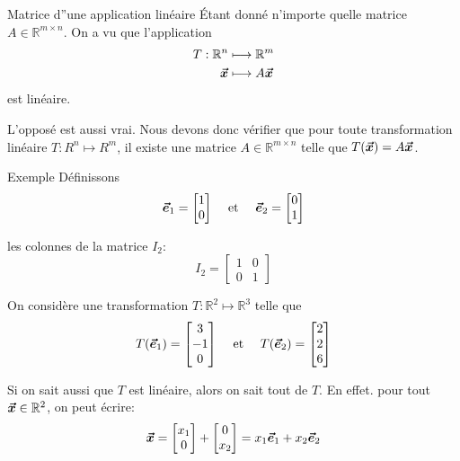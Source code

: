 \documentclass{article}
\begin{document}
\begin{parag}{Matrice d''une application linéaire}
    Étant donné n'importe quelle matrice $A \in \mathbb{R}^{m \times n}$. On a vu que l'application
    \[\begin{split}
    T: \mathbb{R}^{n} &\longmapsto \mathbb{R}^{m} \\
    \bm{\protect\vec{x}} &\longmapsto A \bm{\protect\vec{x}}
    \end{split}\]
    est linéaire.

    L'opposé est aussi vrai. Nous devons donc vérifier que pour toute transformation linéaire $T: R^{n} \mapsto R^{m}$, il existe une matrice $A \in \mathbb{R}^{m \times n}$ telle que $T\left(\bvec{x}\right) = A \bvec{x}$.

    \begin{subparag}{Exemple}
        Définissons
        \[\bvec{e}_1 = \begin{bmatrix} 1 \\ 0 \end{bmatrix} \mathspace \text{ et }\mathspace \bvec{e}_2 = \begin{bmatrix} 0 \\ 1 \end{bmatrix} \]

        les colonnes de la matrice $I_2$:
        \[I_2 = \begin{bmatrix} 1 & 0 \\ 0 & 1 \end{bmatrix} \]

        On considère une transformation $T: \mathbb{R}^{2} \mapsto \mathbb{R}^{3}$ telle que
        \[T\left(\bvec{e}_1\right) = \begin{bmatrix} 3 \\ -1 \\ 0 \end{bmatrix} \mathspace \text{ et } \mathspace T\left(\bvec{e}_2\right) = \begin{bmatrix} 2 \\ 2 \\ 6 \end{bmatrix} \]

        Si on sait aussi que $T$ est linéaire, alors on sait tout de $T$. En effet. pour tout $\bm{\protect\vec{x}} \in \mathbb{R}^2$, on peut écrire:
        \[\bm{\protect\vec{x}} = \begin{bmatrix} x_1 \\ 0 \end{bmatrix} + \begin{bmatrix} 0 \\ x_2 \end{bmatrix} = x_1 \bm{\protect\vec{e}}_1 + x_2 \bm{\protect\vec{e}}_2\]


\end{subparag}
\end{parag}
\end{document}
